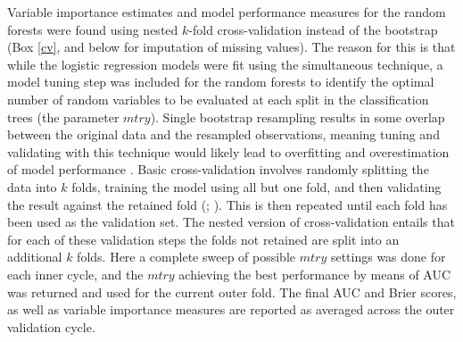 \documentclass[12pt, a4paper]{article}
\begin{document}
Variable importance estimates and model performance measures for the random forests were found using nested $k$-fold cross-validation instead of the bootstrap (Box \ref{cv}, and below for imputation of missing values). The reason for this is that while the logistic regression models were fit using the simultaneous technique, a model tuning step was included for the random forests to identify the optimal number of random variables to be evaluated at each split in the classification trees (the parameter $mtry$). Single bootstrap resampling results in some overlap between the original data and the resampled observations, meaning tuning and validating with this technique would likely lead to overfitting and overestimation of model performance \citep[][250]{hastie2009}. Basic cross-validation involves randomly splitting the data into $k$ folds, training the model using all but one fold, and then validating the result against the retained fold (\citealp[92]{verhagen2009}; \citealp[][241--249]{hastie2009}). This is then repeated until each fold has been used as the validation set. The nested version of cross-validation entails that for each of these validation steps the folds not retained are split into an additional $k$ folds. Here a complete sweep of possible $mtry$ settings was done for each inner cycle, and the $mtry$ achieving the best performance by means of AUC was returned and used for the current outer fold. The final AUC and Brier scores, as well as variable importance measures are reported as averaged across the outer validation cycle.\\
\end{document}
